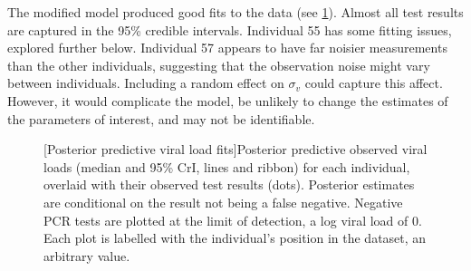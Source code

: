 \documentclass[thesis.tex]{subfiles}
\begin{document}
The modified model produced good fits to the data (see \cref{ATACCC:fig:goodness-of-fits}).
Almost all test results are captured in the 95\% credible intervals.
Individual 55 has some fitting issues, explored further below.
Individual 57 appears to have far noisier measurements than the other individuals, suggesting that the observation noise might vary between individuals.
Including a random effect on $\sigma_v$ could capture this affect.
However, it would complicate the model, be unlikely to change the estimates of the parameters of interest, and may not be identifiable.
\begin{figure}
  \vspace{-3cm}
  \captionsetup{width=0.8\paperwidth}
  [Posterior predictive viral load fits]{Posterior predictive observed viral loads (median and 95\% CrI, lines and ribbon) for each individual, overlaid with their observed test results (dots). Posterior estimates are conditional on the result not being a false negative. Negative PCR tests are plotted at the limit of detection, \ie a log viral load of 0. Each plot is labelled with the individual's position in the dataset, an arbitrary value. \label{ATACCC:fig:goodness-of-fits}}
\end{figure}
\end{document}
